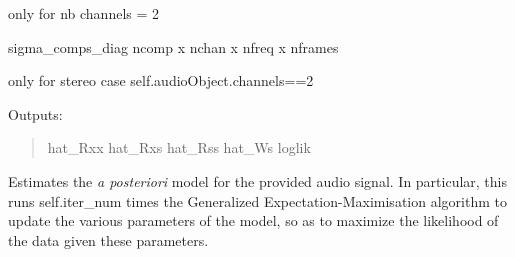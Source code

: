 \documentclass[letterpaper,10pt,english]{sphinxmanual}
\begin{document}
\begin{fulllineitems}
\begin{fulllineitems}
\end{fulllineitems}


\begin{fulllineitems}
\label{reference/audiomodel:pyfasst.audioModel.FASST.compute_inv_sigma_mix_2d}
only for nb channels = 2

sigma\_comps\_diag ncomp x nchan x nfreq x nframes

\end{fulllineitems}


\begin{fulllineitems}
\label{reference/audiomodel:pyfasst.audioModel.FASST.compute_sigma_comp_2d}
only for stereo case self.audioObject.channels==2

\end{fulllineitems}


\begin{fulllineitems}
\label{reference/audiomodel:pyfasst.audioModel.FASST.compute_suff_stat}
Outputs:
\begin{quote}

hat\_Rxx
hat\_Rxs
hat\_Rss
hat\_Ws
loglik
\end{quote}

\end{fulllineitems}


\begin{fulllineitems}
\label{reference/audiomodel:pyfasst.audioModel.FASST.estim_param_a_post_model}
Estimates the \emph{a posteriori} model for the provided
audio signal. In particular, this runs self.iter\_num times
the Generalized Expectation-Maximisation algorithm to
update the various parameters of the model, so as to
maximize the likelihood of the data given these parameters.


\end{fulllineitems}
\end{fulllineitems}
\end{document}
